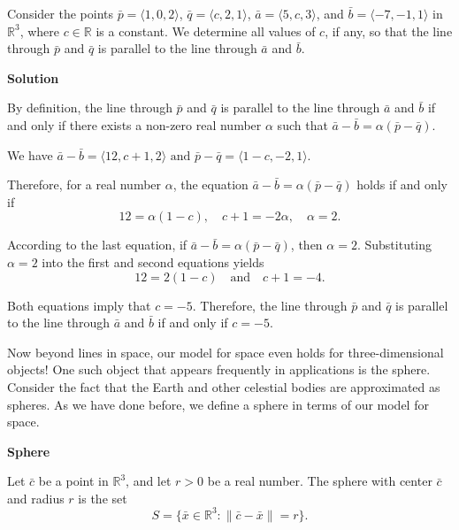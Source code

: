 \begin{examplebox}
  Consider the points \(\bar{p} = \langle 1, 0, 2 \rangle\), \(\bar{q} = \langle c, 2, 1 \rangle\), \(\bar{a} = \langle 5, c, 3 \rangle\), and \(\bar{b} = \langle -7, -1, 1 \rangle\) in \(\mathbb{R}^3\), where \(c \in \mathbb{R}\) is a constant. We determine all values of \(c\), if any, so that the line through \(\bar{p}\) and \(\bar{q}\) is parallel to the line through \(\bar{a}\) and \(\bar{b}\).

\vspace{1em}

\textbf{Solution}

\vspace{1em}

By definition, the line through \(\bar{p}\) and \(\bar{q}\) is parallel to the line through \(\bar{a}\) and \(\bar{b}\) if and only if there exists a non-zero real number \(\alpha\) such that
\(
\bar{a} - \bar{b} = \alpha (\bar{p} - \bar{q}).
\)

We have
\(
\bar{a} - \bar{b} = \langle 12, c + 1, 2 \rangle \text{ and } \bar{p} - \bar{q} = \langle 1 - c, -2, 1 \rangle.
\)

Therefore, for a real number \(\alpha\), the equation \(\bar{a} - \bar{b} = \alpha (\bar{p} - \bar{q})\) holds if and only if
\[
12 = \alpha (1 - c), \quad c + 1 = -2\alpha, \quad \alpha = 2.
\]

According to the last equation, if \(\bar{a} - \bar{b} = \alpha (\bar{p} - \bar{q})\), then \(\alpha = 2\). Substituting \(\alpha = 2\) into the first and second equations yields
\[
12 = 2 (1 - c) \quad \text{and} \quad c + 1 = -4.
\]

Both equations imply that \(c = -5\). Therefore, the line through \(\bar{p}\) and \(\bar{q}\) is parallel to the line through \(\bar{a}\) and \(\bar{b}\) if and only if \(c = -5\).

\end{examplebox}

\vspace{1em}

Now beyond lines in space, our model for space even holds for three-dimensional objects! One such object that appears frequently in applications is the sphere.
Consider the fact that the Earth and other celestial bodies are approximated as spheres. As we have done before, we define a sphere in terms of our model for space.

\begin{definitionbox}

  \textbf{Sphere}

  Let \(\bar{c}\) be a point in \(\mathbb{R}^3\), and let \(r > 0\) be a real number.  
The sphere with center \(\bar{c}\) and radius \(r\) is the set
\[
S = \{\bar{x} \in \mathbb{R}^3 : \|\bar{c} - \bar{x}\| = r \}.
\]
\end{definitionbox}

